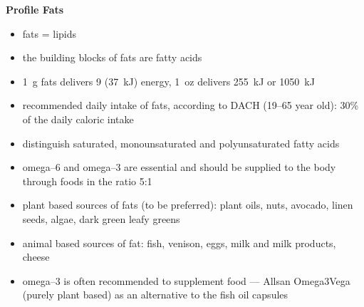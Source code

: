 \documentclass[../main.tex]{subfiles}
\begin{document}
 
\vspace{5mm}
\noindent
\begin{fminipage}{\textwidth}
  \textbf{Profile Fats}
  \begin{itemize}
  \item fats = lipids
  \item the building blocks of fats are fatty acids
  \item \SI{1}{\g} fats delivers \SI{9}{\kcal} (\SI{37}{\kJ}) energy, \SI{1}{oz} delivers \SI{255}{\kJ} or \SI{1050}{\kJ}
  \item recommended daily intake of fats, according to DACH (19--65 year old): 30\% of the daily caloric intake
  \item distinguish saturated, monounsaturated and polyunsaturated fatty acids
  \item omega--6 and omega--3 are essential and should be supplied to the body through foods in the ratio 5:1
  \item plant based sources of fats (to be preferred): plant oils, nuts, avocado, linen seeds, algae, dark green leafy greens
  \item animal based sources of fat: fish, venison, eggs, milk and milk products, cheese
    \item omega--3 is often recommended to supplement food --- Allsan Omega3Vega (purely plant based) as an alternative to the fish oil capsules 
  \end{itemize}
\end{fminipage}
\end{document}
